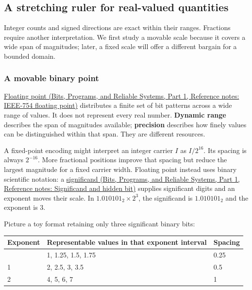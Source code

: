 \subsection{A stretching ruler for real-valued quantities}\label{05-engine-i-ch001-a-stretching-ruler-for-real-valued-quantities}

\hypertarget{05-engine-i-ch001-a-stretching-ruler-for-real-valued-quantities}{}

Integer counts and signed directions are exact within their ranges. Fractions require another interpretation. We first study a movable scale because it covers a wide span of magnitudes; later, a fixed scale will offer a different bargain for a bounded domain.

\subsubsection{A movable binary point}\label{05-engine-i-ch001-a-movable-binary-point}

\hypertarget{05-engine-i-ch001-a-movable-binary-point}{}

\href{../01-Bits-Programs-and-Reliable-Systems-P01/main.pdf\#nameddest=appendix-343615f49ddf}{Floating point (Bits, Programs, and Reliable Systems, Part 1, Reference notes: IEEE-754 floating point)} distributes a finite set of bit patterns across a wide range of values. It does not represent every real number. \textbf{Dynamic range} describes the span of magnitudes available; \textbf{precision} describes how finely values can be distinguished within that span. They are different resources.

A fixed-point encoding might interpret an integer carrier \(I\) as \(I/2^{16}\). Its spacing is always \(2^{-16}\). More fractional positions improve that spacing but reduce the largest magnitude for a fixed carrier width. Floating point instead uses binary scientific notation: a \href{../01-Bits-Programs-and-Reliable-Systems-P01/main.pdf\#nameddest=appendix-a24fd710cf67}{significand (Bits, Programs, and Reliable Systems, Part 1, Reference notes: Significand and hidden bit)} supplies significant digits and an exponent moves their scale. In \(1.010101_2\times2^3\), the significand is \(1.010101_2\) and the exponent is 3.

Picture a toy format retaining only three significant binary bits:

{\def\LTcaptype{none} %
\begin{longtable}[]{@{}lll@{}}
\toprule\noalign{}
Exponent & Representable values in that exponent interval & Spacing \\
\midrule\noalign{}
\endhead
\bottomrule\noalign{}
\endlastfoot
0 & 1, 1.25, 1.5, 1.75 & 0.25 \\
1 & 2, 2.5, 3, 3.5 & 0.5 \\
2 & 4, 5, 6, 7 & 1 \\
\end{longtable}
}

